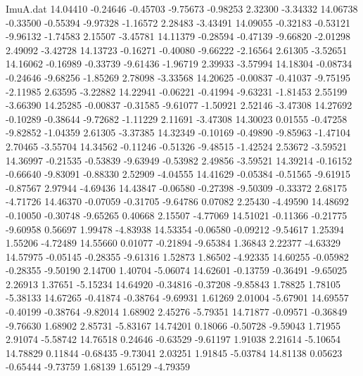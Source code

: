\begin{filecontents}{ImuA.dat}
  14.04410   -0.24646   -0.45703   -9.75673   -0.98253    2.32300   -3.34332
  14.06738   -0.33500   -0.55394   -9.97328   -1.16572    2.28483   -3.43491
  14.09055   -0.32183   -0.53121   -9.96132   -1.74583    2.15507   -3.45781
  14.11379   -0.28594   -0.47139   -9.66820   -2.01298    2.49092   -3.42728
  14.13723   -0.16271   -0.40080   -9.66222   -2.16564    2.61305   -3.52651
  14.16062   -0.16989   -0.33739   -9.61436   -1.96719    2.39933   -3.57994
  14.18304   -0.08734   -0.24646   -9.68256   -1.85269    2.78098   -3.33568
  14.20625   -0.00837   -0.41037   -9.75195   -2.11985    2.63595   -3.22882
  14.22941   -0.06221   -0.41994   -9.63231   -1.81453    2.55199   -3.66390
  14.25285   -0.00837   -0.31585   -9.61077   -1.50921    2.52146   -3.47308
  14.27692   -0.10289   -0.38644   -9.72682   -1.11229    2.11691   -3.47308
  14.30023    0.01555   -0.47258   -9.82852   -1.04359    2.61305   -3.37385
  14.32349   -0.10169   -0.49890   -9.85963   -1.47104    2.70465   -3.55704
  14.34562   -0.11246   -0.51326   -9.48515   -1.42524    2.53672   -3.59521
  14.36997   -0.21535   -0.53839   -9.63949   -0.53982    2.49856   -3.59521
  14.39214   -0.16152   -0.66640   -9.83091   -0.88330    2.52909   -4.04555
  14.41629   -0.05384   -0.51565   -9.61915   -0.87567    2.97944   -4.69436
  14.43847   -0.06580   -0.27398   -9.50309   -0.33372    2.68175   -4.71726
  14.46370   -0.07059   -0.31705   -9.64786    0.07082    2.25430   -4.49590
  14.48692   -0.10050   -0.30748   -9.65265    0.40668    2.15507   -4.77069
  14.51021   -0.11366   -0.21775   -9.60958    0.56697    1.99478   -4.83938
  14.53354   -0.06580   -0.09212   -9.54617    1.25394    1.55206   -4.72489
  14.55660    0.01077   -0.21894   -9.65384    1.36843    2.22377   -4.63329
  14.57975   -0.05145   -0.28355   -9.61316    1.52873    1.86502   -4.92335
  14.60255   -0.05982   -0.28355   -9.50190    2.14700    1.40704   -5.06074
  14.62601   -0.13759   -0.36491   -9.65025    2.26913    1.37651   -5.15234
  14.64920   -0.34816   -0.37208   -9.85843    1.78825    1.78105   -5.38133
  14.67265   -0.41874   -0.38764   -9.69931    1.61269    2.01004   -5.67901
  14.69557   -0.40199   -0.38764   -9.82014    1.68902    2.45276   -5.79351
  14.71877   -0.09571   -0.36849   -9.76630    1.68902    2.85731   -5.83167
  14.74201    0.18066   -0.50728   -9.59043    1.71955    2.91074   -5.58742
  14.76518    0.24646   -0.63529   -9.61197    1.91038    2.21614   -5.10654
  14.78829    0.11844   -0.68435   -9.73041    2.03251    1.91845   -5.03784
  14.81138    0.05623   -0.65444   -9.73759    1.68139    1.65129   -4.79359

\end{filecontents}
